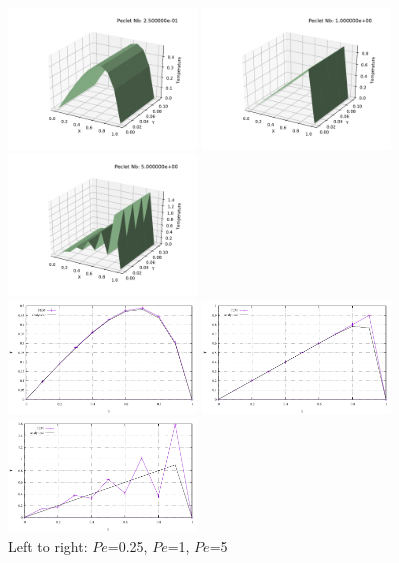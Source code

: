 \begin{center}
\includegraphics[width=5cm]{python_codes/fieldstone_65/results/solution1.pdf}
\includegraphics[width=5cm]{python_codes/fieldstone_65/results/solution2.pdf}
\includegraphics[width=5cm]{python_codes/fieldstone_65/results/solution3.pdf}\\
\includegraphics[width=5cm]{python_codes/fieldstone_65/results/T1.pdf}
\includegraphics[width=5cm]{python_codes/fieldstone_65/results/T2.pdf}
\includegraphics[width=5cm]{python_codes/fieldstone_65/results/T3.pdf}\\
{\captionfont Left to right: $Pe$=0.25, $Pe$=1, $Pe$=5}
\end{center}

